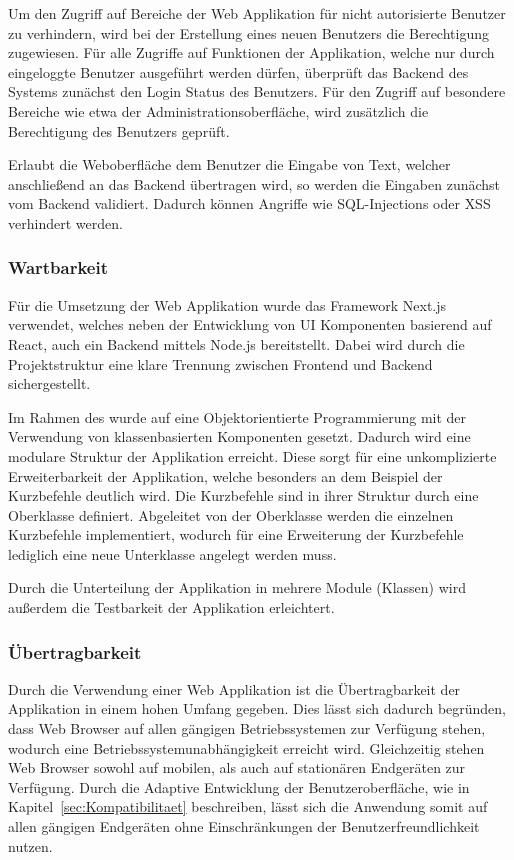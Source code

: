 \noindent{}Um den Zugriff auf Bereiche der Web Applikation für nicht autorisierte Benutzer zu verhindern, wird bei der Erstellung eines neuen Benutzers die Berechtigung  zugewiesen.
Für alle Zugriffe auf Funktionen der Applikation, welche nur durch eingeloggte Benutzer ausgeführt werden dürfen, überprüft das Backend des Systems zunächst den Login Status des Benutzers.
Für den Zugriff auf besondere Bereiche wie etwa der Administrationsoberfläche, wird zusätzlich die Berechtigung des Benutzers geprüft.

\noindent{}Erlaubt die Weboberfläche dem Benutzer die Eingabe von Text, welcher anschließend an das Backend übertragen wird, so werden die Eingaben zunächst vom Backend validiert.
Dadurch können Angriffe wie \ac{SQL}-Injections oder \ac{XSS} verhindert werden.

\subsubsection{Wartbarkeit}
Für die Umsetzung der Web Applikation wurde das Framework Next.js verwendet, welches neben der Entwicklung von UI Komponenten basierend auf React, auch ein Backend mittels Node.js bereitstellt.
Dabei wird durch die Projektstruktur eine klare Trennung zwischen Frontend und Backend sichergestellt.

\noindent{}Im Rahmen des  wurde auf eine Objektorientierte Programmierung mit der Verwendung von klassenbasierten Komponenten gesetzt.
Dadurch wird eine modulare Struktur der Applikation erreicht.
Diese sorgt für eine unkomplizierte Erweiterbarkeit der Applikation, welche besonders an dem Beispiel der Kurzbefehle deutlich wird.
Die Kurzbefehle sind in ihrer Struktur durch eine Oberklasse definiert.
Abgeleitet von der Oberklasse werden die einzelnen Kurzbefehle implementiert, wodurch für eine Erweiterung der Kurzbefehle lediglich eine neue Unterklasse angelegt werden muss.

\noindent{}Durch die Unterteilung der Applikation in mehrere Module (Klassen) wird außerdem die Testbarkeit der Applikation erleichtert.

\subsubsection{Übertragbarkeit}
Durch die Verwendung einer Web Applikation ist die Übertragbarkeit der Applikation in einem hohen Umfang gegeben.
Dies lässt sich dadurch begründen, dass Web Browser auf allen gängigen Betriebssystemen zur Verfügung stehen, wodurch eine Betriebssystemunabhängigkeit erreicht wird.
Gleichzeitig stehen Web Browser sowohl auf mobilen, als auch auf stationären Endgeräten zur Verfügung.
Durch die Adaptive Entwicklung der Benutzeroberfläche, wie in Kapitel~\ref{sec:Kompatibilitaet} beschreiben, lässt sich die Anwendung somit auf allen gängigen Endgeräten ohne Einschränkungen der Benutzerfreundlichkeit nutzen.

